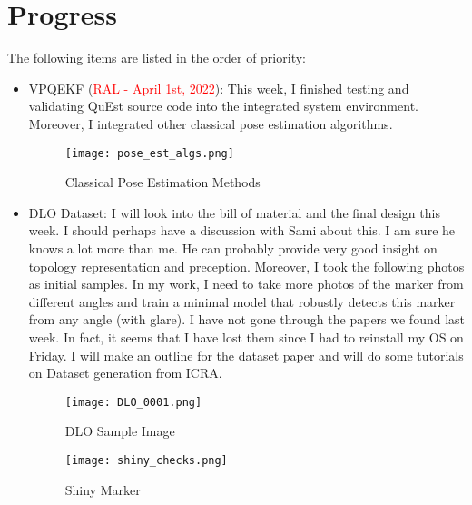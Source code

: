 \documentclass[11pt]{article}
\begin{document}
\section{Progress}
The following items are listed in the order of priority:
\begin{itemize}
    \item VPQEKF (\textcolor{red}{RAL - April 1st, 2022}): This week, I finished
    testing and validating QuEst source code into the integrated system
    environment. Moreover, I integrated other classical pose estimation algorithms.

    \begin{figure}
      \texttt{[image: pose\_est\_algs.png]}
      \caption{Classical Pose Estimation Methods}
      \label{fig:poses}
    \end{figure}

    \item DLO Dataset: I will look into the bill of material and the final design
    this week. I should perhaps have a discussion with Sami about this. I am sure
    he knows a lot more than me. He can probably provide very good insight on
    topology representation and preception. Moreover, I took the following photos
    as initial samples. In my work, I need to take more photos of the marker
    from different angles and train a minimal model that robustly detects this
    marker from any angle (with glare). I have not gone through the papers we
    found last week. In fact, it seems that I have lost them since I had to reinstall
    my OS on Friday. I will make an outline for the dataset paper and will do
    some tutorials on Dataset generation from ICRA.

    \begin{figure}
      \begin{center}
      \texttt{[image: DLO\_0001.png]}
      \caption{DLO Sample Image}
      \label{fig:DLO01}
      \end{center}
    \end{figure}

    \begin{figure}
      \begin{center}
      \texttt{[image: shiny\_checks.png]}
      \caption{Shiny Marker}
      \label{fig:Marker01}
      \end{center}
    \end{figure}


\end{itemize}
\end{document}
